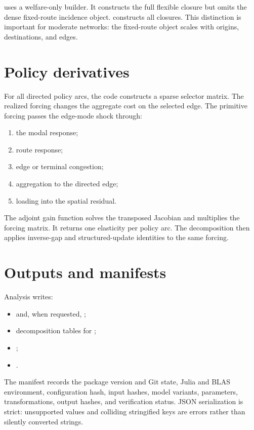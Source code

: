  uses a welfare-only builder. It constructs the full flexible
closure but omits the dense fixed-route incidence object. 
constructs all closures. This distinction is important for moderate networks:
the fixed-route object scales with origins, destinations, and edges.

\section{Policy derivatives}

For all directed policy arcs, the code constructs a sparse selector matrix.
The realized forcing changes the aggregate cost on the selected edge. The
primitive forcing passes the edge-mode shock through:
\begin{enumerate}
  \item the modal response;
  \item route response;
  \item edge or terminal congestion;
  \item aggregation to the directed edge;
  \item loading into the spatial residual.
\end{enumerate}

The adjoint gain function solves the transposed Jacobian and multiplies the
forcing matrix. It returns one elasticity per policy arc. The decomposition
then applies inverse-gap and structured-update identities to the same forcing.

\section{Outputs and manifests}

Analysis writes:
\begin{itemize}
  \item {} and, when requested,
  ;
  \item decomposition tables for ;
  \item {};
  \item {}.
\end{itemize}

The manifest records the package version and Git state, Julia and BLAS
environment, configuration hash, input hashes, model variants, parameters,
transformations, output hashes, and verification status. JSON serialization is
strict: unsupported values and colliding stringified keys are errors rather
than silently converted strings.

